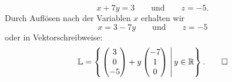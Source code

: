 \begin{loesung}
\begin{teilaufgaben}
\[
x+7y=3
\qquad\text{und}\qquad
z=-5.
\]
Durch Auflösen nach der Variablen $x$ erhalten wir
\[
x = 3-7y
\qquad\text{und}\qquad
z=-5
\]
oder in Vektorschreibweise:
\[
\mathbb L =\left\{\left.
\begin{pmatrix}
3\\
0\\
-5
\end{pmatrix}
+y
\begin{pmatrix}
-7\\
 1\\
 0
\end{pmatrix}
\;
\right|
y\in \mathbb R
\right\}.
\qedhere
\]
\end{teilaufgaben}
\end{loesung}

